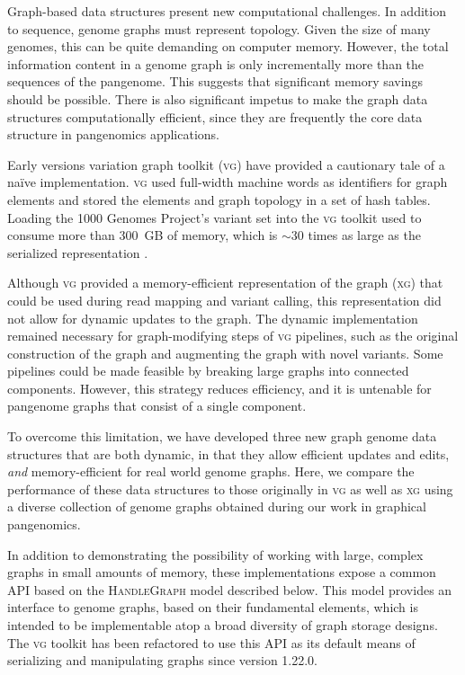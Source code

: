 \documentclass{bioinfo}
\begin{document}
Graph-based data structures present new computational challenges.
In addition to sequence, genome graphs must represent topology.
Given the size of many genomes, this can be quite demanding on computer memory.
However, the total information content in a genome graph is only incrementally more than the sequences of the pangenome.
This suggests that significant memory savings should be possible.
There is also significant impetus to make the graph data structures computationally efficient, since they are frequently the core data structure in pangenomics applications.

Early versions variation graph toolkit (\textsc{vg}) \citep{Garrison_2018} have provided a cautionary tale of a na\"ive implementation.
\textsc{vg} used full-width machine words as identifiers for graph elements and stored the elements and graph topology in a set of hash tables.
Loading the 1000 Genomes Project's variant set into the \textsc{vg} toolkit used to consume more than 300~GB of memory, which is $\sim$30 times as large as the serialized representation \citep{Garrison_2019}.

Although \textsc{vg} provided a memory-efficient representation of the graph (\textsc{xg}) that could be used during read mapping and variant calling, this representation did not allow for dynamic updates to the graph.
The dynamic implementation remained necessary for graph-modifying steps of \textsc{vg} pipelines, such as the original construction of the graph and augmenting the graph with novel variants.
Some pipelines could be made feasible by breaking large graphs into connected components.
However, this strategy reduces efficiency, and it is untenable for pangenome graphs that consist of a single component.

To overcome this limitation, we have developed three new graph genome data structures that are both dynamic, in that they allow efficient updates and edits, \emph{and} memory-efficient for real world genome graphs.
Here, we compare the performance of these data structures to those originally in \textsc{vg} as well as \textsc{xg} using a diverse collection of genome graphs obtained during our work in graphical pangenomics.

In addition to demonstrating the possibility of working with large, complex graphs in small amounts of memory, these implementations expose a common API based on the \textsc{HandleGraph} model described below.
This model provides an interface to genome graphs, based on their fundamental elements, which is intended to be implementable atop a broad diversity of graph storage designs.
The \textsc{vg} toolkit has been refactored to use this API as its default means of serializing and manipulating graphs since version 1.22.0. 
\end{document}
